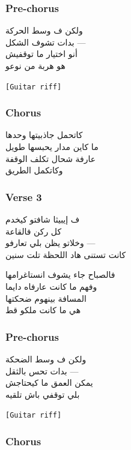\documentclass[]{article}
\begin{document}
\subsubsection{Pre-chorus}\label{pre-chorus-39}

{\arabicfont ولكن ف وسط الحركة\\
بدات تشوف الشكل ---\\
أنو اختيار ما توقفيش\\
هو هربة من نوعو}

\texttt{{[}Guitar\ riff{]}}

\subsubsection{Chorus}\label{chorus-67}

{\arabicfont كاتحمل جاذبيتها وحدها\\
ما كاين مدار يحبسها طويل\\
عارفة شحال تكلف الوقفة\\
وكاتكمل الطريق}

\subsubsection{Verse 3}\label{verse-3-10}

{\arabicfont ف إيبيثا شافتو كيخدم\\
كل ركن فالقاعة\\
وخلاتو يظن بلي تعارفو ---\\
كانت تستنى هاد اللحظة تلت سنين}

{\arabicfont فالصباح جاء يشوف انستاغرامها\\
وفهم ما كانت عارفاه دايما\\
المسافة بينهوم ضحكتها\\
هي ما كانت ملكو قط}

\subsubsection{Pre-chorus}\label{pre-chorus-40}

{\arabicfont ولكن ف وسط الضحكة\\
بدات تحس بالثقل ---\\
يمكن العمق ما كيحتاجش\\
بلي توقفي باش تلقيه}

\texttt{{[}Guitar\ riff{]}}

\subsubsection{Chorus}\label{chorus-68}
\end{document}
